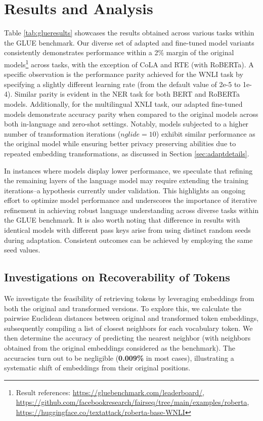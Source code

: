 \documentclass[letterpaper]{article} %
\begin{document}
\section{Results and Analysis}
\label{sec:results}
Table \ref{tab:glueresults} showcases the results obtained across various tasks within the GLUE benchmark. Our diverse set of adapted and fine-tuned model variants consistently demonstrates performance within a 2\% margin of the original models\footnote{Result references: \url{https://gluebenchmark.com/leaderboard/}, \url{https://github.com/facebookresearch/fairseq/tree/main/examples/roberta}, \url{https://huggingface.co/textattack/roberta-base-WNLI}} across tasks, with the exception of CoLA and RTE (with RoBERTa). A specific observation is the performance parity achieved for the WNLI task by specifying a slightly different learning rate (from the default value of 2e-5 to 1e-4). Similar parity is evident in the NER task for both BERT and RoBERTa models. Additionally, for the multilingual XNLI task, our adapted fine-tuned models demonstrate accuracy parity when compared to the original models across both in-language and zero-shot settings. Notably, models subjected to a higher number of transformation iterations ($nglide=10$) exhibit similar performance as the original model while ensuring better privacy preserving abilities due to repeated embedding transformations, as discussed in Section \ref{sec:adaptdetails}. 

In instances where models display lower performance, we speculate that refining the remaining layers of the language model may require extending the training iterations--a hypothesis currently under validation. This highlights an ongoing effort to optimize model performance and underscores the importance of iterative refinement in achieving robust language understanding across diverse tasks within the GLUE benchmark. It is also worth noting that difference in results with identical models with different pass keys arise from using distinct random seeds during adaptation. Consistent outcomes can be achieved by employing the same seed values.

\subsection{Investigations on Recoverability of Tokens}
We investigate the feasibility of retrieving tokens by leveraging embeddings from both the original and transformed versions. To explore this, we calculate the pairwise Euclidean distances between original and transformed token embeddings, subsequently compiling a list of closest neighbors for each vocabulary token. We then determine the accuracy of predicting the nearest neighbor (with neighbors obtained from the original embeddings considered as the benchmark). The accuracies turn out to be negligible (\textbf{0.009\%} in most cases), illustrating a systematic shift of embeddings from their original positions.
\end{document}
